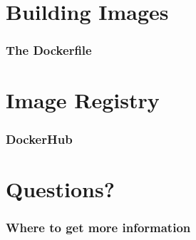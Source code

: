 \documentclass[aspectratio=169,11pt,hyperref={colorlinks=true}]{beamer}
\begin{document}
\section{Building Images}
\begin{frame}
    \frametitle{The Dockerfile}
    
\end{frame}

\section{Image Registry}
\begin{frame}
    \frametitle{DockerHub}

\end{frame}



\section{Questions?}
\begin{frame}
\frametitle{Where to get more information}

\end{frame}
\end{document}
